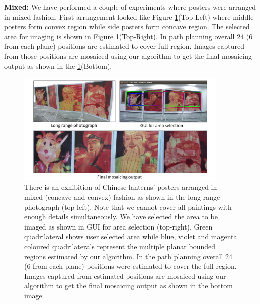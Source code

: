 \textbf{Mixed:} We have performed a couple of experiments where posters were
arranged in mixed fashion. First arrangement looked like Figure
\ref{fig:resultMixed1}(Top-Left) where middle posters form convex region while
side posters form concave region. The selected area for imaging is shown in
Figure \ref{fig:resultMixed1}(Top-Right). In path planning overall 24 (6 from each
plane) positions are estimated to cover full region. Images captured from
those positions are mosaiced using our algorithm to get the final mosaicing
output as shown in the \ref{fig:resultMixed1}(Bottom).
\begin{figure}
\centering
\includegraphics[width=0.9\textwidth]{figures/multiplanar/mixed1Result.pdf}
\caption[Result: Mixed arrangement]{There is an exhibition of Chinese lanterns'
posters arranged in mixed (concave and convex) fashion as shown in the long range photograph
(top-left). Note that we cannot cover all paintings with enough details
simultaneously. We have selected the area to be imaged as shown in GUI for
area selection (top-right). Green quadrilateral shows user selected area while
blue, violet and magenta coloured quadrilaterals represent the multiple
planar bounded regions estimated by our algorithm. In the path planning overall
24 (6 from each plane) positions were estimated to cover the full region. Images
captured from estimated positions are mosaiced using our algorithm to get the
final mosaicing output as shown in the bottom image.}
\label{fig:resultMixed1}
\end{figure}

